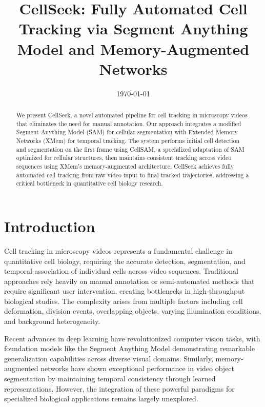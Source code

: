 \documentclass[12pt]{article}
\title{CellSeek: Fully Automated Cell Tracking via Segment Anything Model and Memory-Augmented Networks}
\author{}
\date{\today}
\begin{document}
\maketitle

\begin{abstract}
  We present CellSeek, a novel automated pipeline for cell tracking in microscopy videos that eliminates the need for manual annotation. Our approach integrates a modified Segment Anything Model (SAM) for cellular segmentation with Extended Memory Networks (XMem) for temporal tracking. The system performs initial cell detection and segmentation on the first frame using CellSAM, a specialized adaptation of SAM optimized for cellular structures, then maintains consistent tracking across video sequences using XMem's memory-augmented architecture. CellSeek achieves fully automated cell tracking from raw video input to final tracked trajectories, addressing a critical bottleneck in quantitative cell biology research.
\end{abstract}


\section{Introduction}

Cell tracking in microscopy videos represents a fundamental challenge in quantitative cell biology, requiring the accurate detection, segmentation, and temporal association of individual cells across video sequences. Traditional approaches rely heavily on manual annotation or semi-automated methods that require significant user intervention, creating bottlenecks in high-throughput biological studies. The complexity arises from multiple factors including cell deformation, division events, overlapping objects, varying illumination conditions, and background heterogeneity.

Recent advances in deep learning have revolutionized computer vision tasks, with foundation models like the Segment Anything Model demonstrating remarkable generalization capabilities across diverse visual domains. Similarly, memory-augmented networks have shown exceptional performance in video object segmentation by maintaining temporal consistency through learned representations. However, the integration of these powerful paradigms for specialized biological applications remains largely unexplored.
\end{document}

